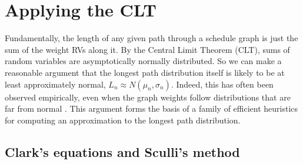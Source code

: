 \documentclass[12pt]{article}
\begin{document}

\section{Applying the CLT}
\label{sect.CLT}

Fundamentally, the length of any given path through a schedule graph is just the sum of the weight RVs along it. By the Central Limit Theorem (CLT), sums of random variables are asymptotically normally distributed. So we can make a reasonable argument that the longest path distribution itself is likely to be at least approximately normal, $L_n \approx N(\mu_n, \sigma_n)$. Indeed, this has often been observed empirically, even when the graph weights follow distributions that are far from normal \cite{can10}. This argument forms the basis of a family of efficient heuristics for computing an approximation to the longest path distribution.

\subsection{Clark's equations and Sculli's method}
\label{subsect.clark_sculli}
\end{document}
